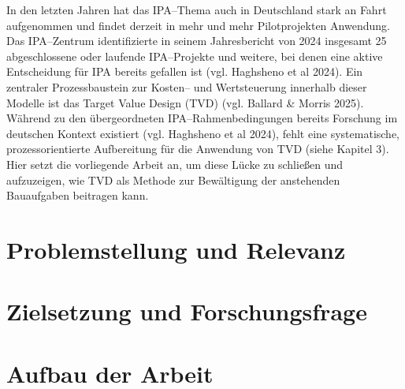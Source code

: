 In den letzten Jahren hat das IPA--Thema auch in Deutschland stark an Fahrt aufgenommen und findet derzeit in mehr und mehr Pilotprojekten Anwendung. Das IPA--Zentrum identifizierte in seinem Jahresbericht von 2024 insgesamt 25 abgeschlossene oder laufende IPA--Projekte und weitere, bei denen eine aktive Entscheidung für IPA bereits gefallen ist (vgl. Haghsheno et al 2024). Ein zentraler Prozessbaustein zur Kosten-- und Wertsteuerung innerhalb dieser Modelle ist das Target Value Design (TVD) (vgl. Ballard \& Morris 2025). Während zu den übergeordneten IPA--Rahmenbedingungen bereits Forschung im deutschen Kontext existiert (vgl. Haghsheno et al 2024), fehlt eine systematische, prozessorientierte  Aufbereitung für die Anwendung von TVD (siehe Kapitel 3). Hier setzt die vorliegende  Arbeit an, um diese Lücke zu schließen und aufzuzeigen, wie TVD als Methode zur Bewältigung der anstehenden Bauaufgaben beitragen kann.

\section{Problemstellung und Relevanz}
\label{sec:problemstellung}

\section{Zielsetzung und Forschungsfrage}
\label{sec:zielsetzung}

\section{Aufbau der Arbeit}
\label{sec:aufbau}
